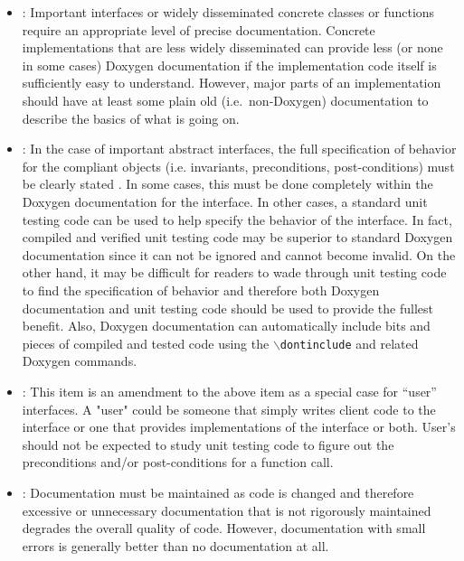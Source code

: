 \begin{itemize}


{}\item\DOXPVariableLevelOfDetail: Important interfaces or widely disseminated
concrete classes or functions require an appropriate level of precise
documentation.  Concrete implementations that are less widely disseminated can
provide less (or none in some cases) Doxygen documentation if the
implementation code itself is sufficiently easy to understand.  However, major
parts of an implementation should have at least some plain old (i.e.\
non-Doxygen) documentation to describe the basics of what is going on.


{}\item\DOXPFullyDocumentInterfaces: In the case of important abstract
interfaces, the full specification of behavior for the compliant objects
(i.e. invariants, preconditions, post-conditions) must be clearly stated
{}\cite[Item 69]{C++CodingStandards05}.  In some cases, this must be done
completely within the Doxygen documentation for the interface.  In other
cases, a standard unit testing code can be used to help specify the behavior
of the interface.  In fact, compiled and verified unit testing code may be
superior to standard Doxygen documentation since it can not be ignored and
cannot become invalid.  On the other hand, it may be difficult for readers to
wade through unit testing code to find the specification of behavior and
therefore both Doxygen documentation and unit testing code should be used to
provide the fullest benefit.  Also, Doxygen documentation can automatically
include bits and pieces of compiled and tested code using the
{}\texttt{$\backslash$dontinclude} and related Doxygen commands.


{}\item\DOXPFullyDocumentUserIntefaces: This item is an amendment to the above
item as a special case for ``user'' interfaces.  A "user" could be someone
that simply writes client code to the interface or one that provides
implementations of the interface or both.  User's should not be expected to
study unit testing code to figure out the preconditions and/or post-conditions
for a function call.


{}\item\DOXPWrongDocumentationBad: Documentation must be maintained as code is
changed and therefore excessive or unnecessary documentation that is not
rigorously maintained degrades the overall quality of code.  However,
documentation with small errors is generally better than no documentation at
all.



\end{itemize}
